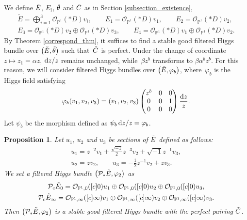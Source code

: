 \documentclass[pdftex]{sigma}
\numberwithin{equation}{section}
\newtheorem{Proposition}[Theorem]{Proposition}
 { \theoremstyle{definition}
\newtheorem{Definition}[Theorem]{Definition}
\newtheorem{Note}[Theorem]{Note}
\newtheorem{Example}[Theorem]{Example}
\newtheorem{Remark}[Theorem]{Remark}

\newtheorem{Question}[Theorem]{Question}
\newtheorem{Assumption}[Theorem]{Assumption}}
\newcommand{\ps}{\mathbb{P}}
\newcommand{\strsheaf}{\mathcal{O}}
\begin{document}
We define $\Tilde{E}$, $E_i$, $\Tilde{\theta}$ and $\Tilde{C}$ as in Section \ref{subsection_existence},
\begin{gather*}
 \tilde{E} = \bigoplus_{i=1}^3 \strsheaf_{\ps^1}(*D)v_i,\qquad E_1 = \strsheaf_{\ps^1}(*D)v_1,\qquad E_2 = \strsheaf_{\ps^1}(*D)v_2, \\
 E_3 = \strsheaf_{\ps^1}(*D)v_2\oplus \strsheaf_{\ps^1}(*D)v_3,\qquad E_4 = \strsheaf_{\ps^1}(*D)v_1\oplus \strsheaf_{\ps^1}(*D)v_2.
\end{gather*}
By Theorem \ref{correspond_thm}, it suffices to find a stable good filtered Higgs bundle over $\bigl(\Tilde{E},\Tilde{\theta}\bigr)$ such that~$\Tilde{C}$ is perfect. Under the change of coordinate $z\mapsto z_1=\alpha z$, ${\rm d}z/z$ remains unchanged, while~$\beta z^b$ transforms to $\beta \alpha^b z^b$. For this reason, we will consider filtered Higgs bundles over $\big(\Tilde{E},\varphi_b\big)$, where~$\varphi_b$ is the Higgs field satisfying
\begin{equation*}
 \varphi_b(v_1,v_2,v_3) = (v_1,v_2,v_3) \begin{pmatrix}
 z^b & 0 & 0\\
 0 & 0 & 1 \\
 0 & 0 & 0
 \end{pmatrix}\frac{{\rm d}z}{z}.
\end{equation*}
Let $\psi_b$ be the morphism defined as $\psi_b\,{\rm d}z/z=\varphi_b$.
\begin{Proposition}\label{prop_Cstar_b2}
 Let $u_1$, $u_2$ and $u_3$ be sections of $\Tilde{E}$ defined as follows:
 \begin{gather*}
 u_1 = z^{-2}v_1 + \frac{\sqrt{-1}}{2}z^{-3}v_2 + \sqrt{-1}z^{-1}v_3,\\
 u_2 = zv_2,\qquad u_3 = -\frac{1}{2} z^{-1}v_2 + zv_3.
 \end{gather*}
 We set a filtered Higgs bundle $\big(\mathcal{P}_{*}\Tilde{E},\varphi_2\big)$ as
 \begin{gather*}
 \mathcal{P}_c \Tilde{E}_{0} = \strsheaf_{\ps^1,0}([c]0)u_1\oplus \strsheaf_{\ps^1,0}([c]0)u_2\oplus \strsheaf_{\ps^1,0}([c]0)u_3,\\
 \mathcal{P}_c \Tilde{E}_{\infty} = \strsheaf_{\ps^1,\infty}([c]\infty)v_1\oplus \strsheaf_{\ps^1,\infty}([c]\infty)v_2\oplus \strsheaf_{\ps^1,\infty}([c]\infty)v_3.
 \end{gather*}
 Then $\big(\mathcal{P}_{*}\Tilde{E},\varphi_2\big)$ is a stable good filtered Higgs bundle with the perfect pairing $\Tilde{C}$.
\end{Proposition}
\end{document}

